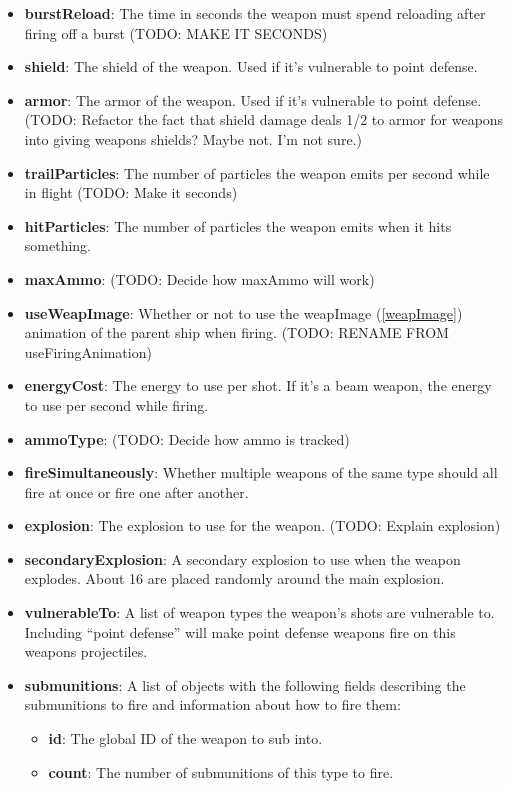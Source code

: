 \documentclass{article}
\begin{document}
\begin{itemize}
\item{\textbf{burstReload}}: The time in seconds the weapon must spend reloading after firing off a burst (TODO: MAKE IT SECONDS)
\item{\textbf{shield}}: The shield of the weapon. Used if it's vulnerable to point defense.
\item{\textbf{armor}}: The armor of the weapon. Used if it's vulnerable to point defense. (TODO: Refactor the fact that shield damage deals 1/2 to armor for weapons into giving weapons shields? Maybe not. I'm not sure.)
\item{\textbf{trailParticles}}: The number of particles the weapon emits per second while in flight (TODO: Make it seconds)
\item{\textbf{hitParticles}}: The number of particles the weapon emits when it hits something.
\item{\textbf{maxAmmo}}: (TODO: Decide how maxAmmo will work)
\item{\textbf{useWeapImage}}: Whether or not to use the weapImage (\ref{weapImage}) animation of the parent ship when firing. (TODO: RENAME FROM useFiringAnimation)
\item{\textbf{energyCost}}: The energy to use per shot. If it's a beam weapon, the energy to use per second while firing.
\item{\textbf{ammoType}}: (TODO: Decide how ammo is tracked)
\item{\textbf{fireSimultaneously}}: Whether multiple weapons of the same type should all fire at once or fire one after another.
\item{\textbf{explosion}}: The explosion to use for the weapon. (TODO: Explain explosion)
\item{\textbf{secondaryExplosion}}: A secondary explosion to use when the weapon explodes. About 16 are placed randomly around the main explosion.
\item{\textbf{vulnerableTo}}: A list of weapon types the weapon's shots are vulnerable to. Including ``point defense'' will make point defense weapons fire on this weapons projectiles.
\item{\textbf{submunitions}}: A list of objects with the following fields describing the submunitions to fire and information about how to fire them:
  \begin{itemize}
    \item{\textbf{id}}: The global ID of the weapon to sub into.
    \item{\textbf{count}}: The number of submunitions of this type to fire.

\end{itemize}
\end{itemize}
\end{document}
